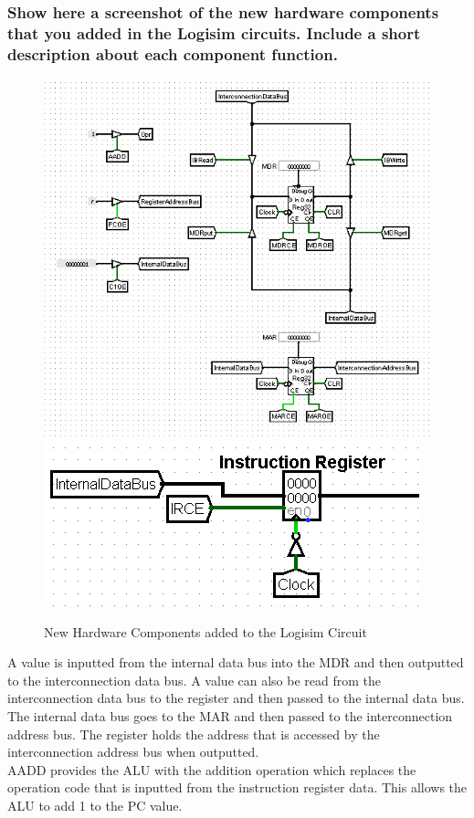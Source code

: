 \documentclass{article}
\begin{document}
	\pagebreak

	\subsubsection{Show here a screenshot of the new hardware components that you added in the Logisim circuits. Include a short description about each component function.}
	\begin{figure}[!ht]
		\centering
		\includegraphics[width=0.7\linewidth]{hardware_added.png}
		\includegraphics[width=0.5\linewidth]{instruction_register.png}
		\caption{New Hardware Components added to the Logisim Circuit}
	\end{figure}

	A value is inputted from the internal data bus into the MDR and then outputted to the interconnection data bus. A value can also be read from the interconnection data bus to the register and then passed to the internal data bus.\\
	
	The internal data bus goes to the MAR and then passed to the interconnection address bus.
	The register holds the address that is accessed by the interconnection address bus when outputted.\\
	
	AADD provides the ALU with the addition operation which replaces the operation code that is inputted from the instruction register data.
	This allows the ALU to add 1 to the PC value.\\
	
\end{document}
